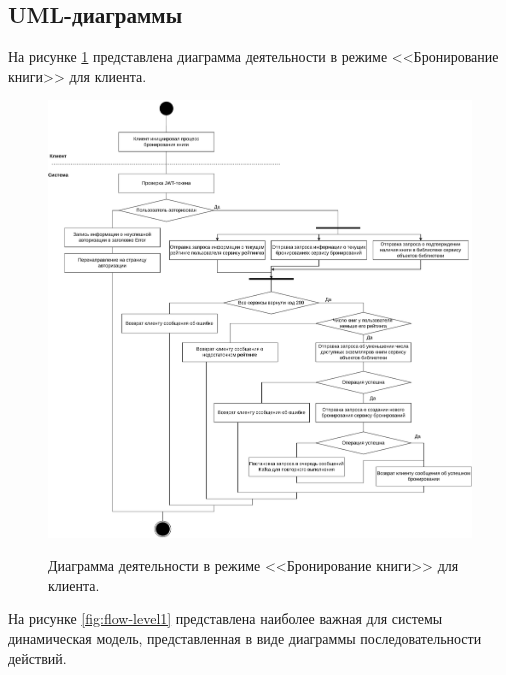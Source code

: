 \documentclass[a4paper, 12pt]{article}
\begin{document}
\begin{large}
\pagebreak
\subsection{UML-диаграммы}


На рисунке \ref{fig:schema-reservation} представлена диаграмма деятельности в режиме <<Бронирование книги>> для клиента.

\begin{figure}[h!]
	\begin{center}
		{\includegraphics[scale = 0.5]{Activity}}
		\caption{Диаграмма деятельности в режиме <<Бронирование книги>> для клиента.}
		\label{fig:schema-reservation}
	\end{center}
\end{figure}

\pagebreak

\begin{landscape}

На рисунке \ref{fig:flow-level1} представлена наиболее важная для системы динамическая модель, представленная в виде диаграммы последовательности действий.


\end{landscape}
\end{large}
\end{document}

